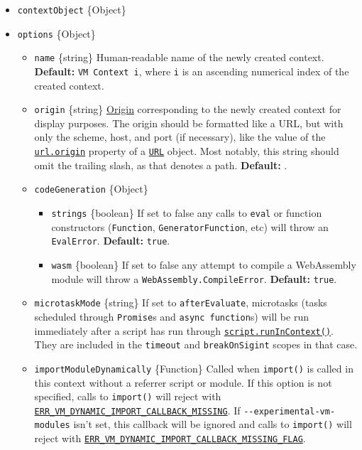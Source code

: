 \begin{itemize}
\tightlist
\item
  \texttt{contextObject} \{Object\}
\item
  \texttt{options} \{Object\}

  \begin{itemize}
  \tightlist
  \item
    \texttt{name} \{string\} Human-readable name of the newly created
    context. \textbf{Default:}
    \texttt{\textquotesingle{}VM\ Context\ i\textquotesingle{}}, where
    \texttt{i} is an ascending numerical index of the created context.
  \item
    \texttt{origin} \{string\}
    \href{https://developer.mozilla.org/en-US/docs/Glossary/Origin}{Origin}
    corresponding to the newly created context for display purposes. The
    origin should be formatted like a URL, but with only the scheme,
    host, and port (if necessary), like the value of the
    \href{url.md\#urlorigin}{\texttt{url.origin}} property of a
    \href{url.md\#class-url}{\texttt{URL}} object. Most notably, this
    string should omit the trailing slash, as that denotes a path.
    \textbf{Default:} \texttt{\textquotesingle{}\textquotesingle{}}.
  \item
    \texttt{codeGeneration} \{Object\}

    \begin{itemize}
    \tightlist
    \item
      \texttt{strings} \{boolean\} If set to false any calls to
      \texttt{eval} or function constructors (\texttt{Function},
      \texttt{GeneratorFunction}, etc) will throw an \texttt{EvalError}.
      \textbf{Default:} \texttt{true}.
    \item
      \texttt{wasm} \{boolean\} If set to false any attempt to compile a
      WebAssembly module will throw a \texttt{WebAssembly.CompileError}.
      \textbf{Default:} \texttt{true}.
    \end{itemize}
  \item
    \texttt{microtaskMode} \{string\} If set to \texttt{afterEvaluate},
    microtasks (tasks scheduled through \texttt{Promise}s and
    \texttt{async\ function}s) will be run immediately after a script
    has run through
    \hyperref[scriptrunincontextcontextifiedobject-options]{\texttt{script.runInContext()}}.
    They are included in the \texttt{timeout} and \texttt{breakOnSigint}
    scopes in that case.
  \item
    \texttt{importModuleDynamically} \{Function\} Called when
    \texttt{import()} is called in this context without a referrer
    script or module. If this option is not specified, calls to
    \texttt{import()} will reject with
    \href{errors.md\#err_vm_dynamic_import_callback_missing}{\texttt{ERR\_VM\_DYNAMIC\_IMPORT\_CALLBACK\_MISSING}}.
    If \texttt{-\/-experimental-vm-modules} isn't set, this callback
    will be ignored and calls to \texttt{import()} will reject with
    \href{errors.md\#err_vm_dynamic_import_callback_missing_flag}{\texttt{ERR\_VM\_DYNAMIC\_IMPORT\_CALLBACK\_MISSING\_FLAG}}.


\end{itemize}
\end{itemize}
